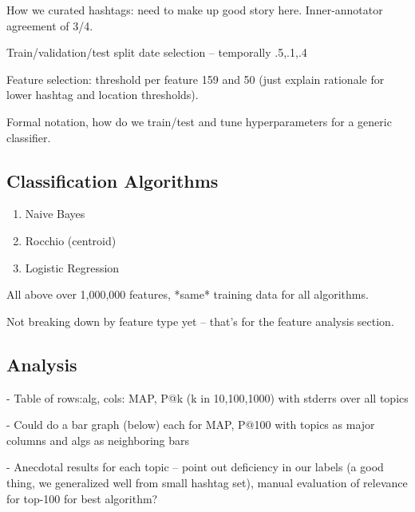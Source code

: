 How we curated hashtags: need to make up good story here.  Inner-annotator agreement of 3/4.

Train/validation/test split date selection -- temporally .5,.1,.4

Feature selection: threshold per feature 159 and 50 (just explain rationale for lower hashtag and location thresholds).

Formal notation, how do we train/test and tune hyperparameters for a generic classifier.

\subsection{Classification Algorithms}

\begin{enumerate}
\item Naive Bayes
\item Rocchio (centroid)
\item Logistic Regression
\end{enumerate}

All above over 1,000,000 features, *same* training data for all algorithms.

Not breaking down by feature type yet -- that's for the feature analysis section.

\subsection{Analysis}

- Table of rows:alg, cols: MAP, P@k (k in {10,100,1000}) with stderrs over all topics

- Could do a bar graph (below) each for MAP, P@100 with topics as major columns and algs as neighboring bars

- Anecdotal results for each topic -- point out deficiency in our labels (a good thing, we generalized well from small hashtag set), manual evaluation of relevance for top-100 for best algorithm?

